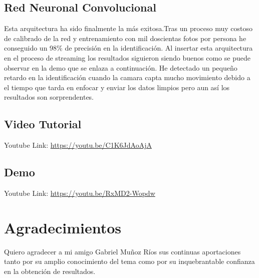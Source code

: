 \documentclass{article}
\begin{document}
\subsection{Red Neuronal Convolucional}
Esta arquitectura ha sido finalmente la más exitosa.\newline Tras un proceso muy costoso de calibrado de la red y entrenamiento con mil doscientas fotos por persona he conseguido un 98\% de precisión en la identificación.\newline
Al insertar esta arquitectura en el proceso de streaming los resultados siguieron siendo buenos como se puede observar en la demo que se enlaza a continuación. He detectado un pequeño retardo en la identificación cuando la camara capta mucho movimiento debido a el tiempo que tarda en enfocar y enviar los datos limpios pero aun así los resultados son sorprendentes.

\subsection{Video Tutorial}
Youtube Link:
\url{https://youtu.be/C1K6JdAoAjA}

\subsection{Demo}
Youtube Link:
\url{https://youtu.be/RxMD2-Wopdw}

\section{Agradecimientos}
Quiero agradecer a mi amigo Gabriel Muñoz Ríos \cite{gabriel_munoz} sus continuas aportaciones tanto por su amplio conocimiento del tema como por su inquebrantable confianza en la obtención de resultados.



\end{document}
